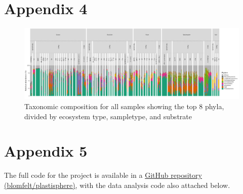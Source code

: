 \chapter{Appendix 4}
\label{appendix:tax}
\begin{figure}[h]
    \centering
    \includegraphics[width = 1.05\textheight, angle = 90]{figure/tax_phylum_ecosystem_sampletype_substrate.png}
    \caption{Taxonomic composition for all samples showing the top 8 phyla, divided by ecosystem type, sampletype, and substrate}
    \label{tax_plot_substrate_flip}
\end{figure}


\chapter{Appendix 5}
\label{appendix:code}
The full code for the project is available in a \href{https://github.com/blomfelt/plastisphere/}{GitHub repository (blomfelt/plastisphere)}, with the data analysis code also attached below.

